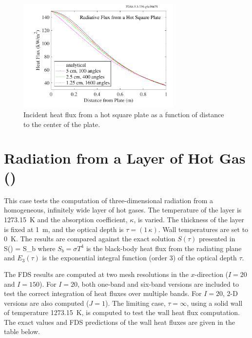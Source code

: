 \documentclass[11pt]{book}
\begin{document}
\begin{figure}[ht]
\centering
\includegraphics[width=3.2in]{SCRIPT_FIGURES/radiating_polygon_square}
\caption[The {\ct radiating\_polygon} test case]{Incident heat flux from a hot square plate as a function of distance to the center of the plate.}
\label{radiating_polygon_figure}
\end{figure}



\section{Radiation from a Layer of Hot Gas (\texorpdfstring{}{radiation\_plane\_layer})}
\label{radiation_plane_layer}

This case tests the computation of three-dimensional radiation from a homogeneous, infinitely wide layer of hot gases.  The temperature of
the layer is 1273.15~K and the absorption coefficient, $\kappa$, is varied. The thickness of the layer is fixed at 1~m, and the optical depth is $\tau = (1 \, \kappa)$.
Wall temperatures are set to 0~K. The results are compared against the exact solution $S(\tau)$ presented in~\cite{Zeldovich:1}
\be S(\tau) = S_b \ee
where $S_b = \sigma T^4$ is the black-body heat flux from the radiating plane and $E_3(\tau)$ is the exponential
integral function (order 3) of the optical depth $\tau$.

The FDS results are computed at two mesh resolutions in the $x$-direction ($I=20$ and $I=150$). For $I=20$, both one-band and six-band versions are
included to test the correct integration of heat fluxes over multiple bands. For $I=20$, 2-D versions are also computed ($J=1$). The limiting case, $\tau=\infty$,
using a solid wall of temperature 1273.15~K, is computed to test the wall heat flux computation. The exact values and FDS predictions of
the wall heat fluxes are given in the table below.
\end{document}
